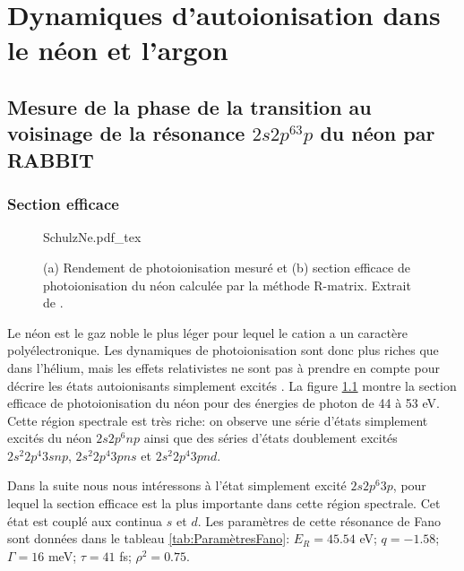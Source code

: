 \part{Dynamiques d'autoionisation dans le néon et l'argon}
\label{part:Argon}


\chapter[Mesure de la phase de la transition au voisinage de la résonance $2s2p^63p$ du néon par RABBIT]{Mesure de la phase de la transition au voisinage de la résonance \MakeLowercase{$2s2p^63p$} du néon par RABBIT}
\label{chap:Neon}

\section{Section efficace}
\begin{figure}[ht]
\centering
\def\svgwidth{0.6\textwidth}
{SchulzNe.pdf_tex}
\caption{(a) Rendement de photoionisation mesuré et (b) section efficace de photoionisation du néon calculée par la méthode R-matrix. Extrait de .}
\label{fig:SchulzNe}
\end{figure}

Le néon est le gaz noble le plus léger pour lequel le cation a un caractère polyélectronique. Les dynamiques de photoionisation sont donc plus riches que dans l'hélium, mais les effets relativistes ne sont pas à prendre en compte pour décrire les états autoionisants simplement excités . La figure \ref{fig:SchulzNe} montre la section efficace de photoionisation du néon pour des énergies de photon de 44 à 53 eV. Cette région spectrale est très riche: on observe une série d'états simplement excités du néon $2s2p^{6}np$ ainsi que des séries d'états doublement excités $2s^{2}2p^{4}3snp$, $2s^{2}2p^{4}3pns$ et $2s^{2}2p^{4}3pnd$. 

Dans la suite nous nous intéressons à l'état simplement excité $2s2p^{6}3p$, pour lequel la section efficace est la plus importante dans cette région spectrale. Cet état est couplé aux continua $s$ et $d$. Les paramètres de cette résonance de Fano sont données dans le tableau \ref{tab:ParamètresFano}: $E_R = 45.54$ eV; $q = -1.58$; $\Gamma =  16$ meV; $\tau = 41$ fs; $\rho^2 = 0.75$.


